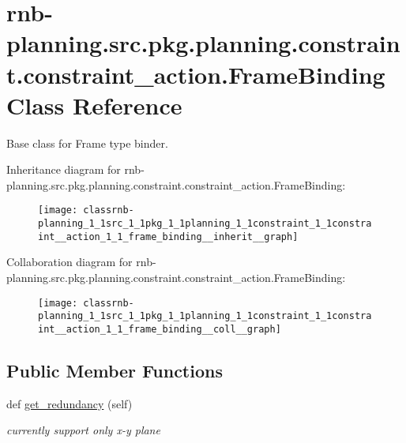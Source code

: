 \hypertarget{classrnb-planning_1_1src_1_1pkg_1_1planning_1_1constraint_1_1constraint__action_1_1_frame_binding}{}\section{rnb-\/planning.src.\+pkg.\+planning.\+constraint.\+constraint\+\_\+action.\+Frame\+Binding Class Reference}
\label{classrnb-planning_1_1src_1_1pkg_1_1planning_1_1constraint_1_1constraint__action_1_1_frame_binding}


Base class for Frame type binder.  




Inheritance diagram for rnb-\/planning.src.\+pkg.\+planning.\+constraint.\+constraint\+\_\+action.\+Frame\+Binding\+:\nopagebreak
\begin{figure}[H]
\begin{center}
\leavevmode
\texttt{[image: classrnb-planning\_1\_1src\_1\_1pkg\_1\_1planning\_1\_1constraint\_1\_1constraint\_\_action\_1\_1\_frame\_binding\_\_inherit\_\_graph]}
\end{center}
\end{figure}


Collaboration diagram for rnb-\/planning.src.\+pkg.\+planning.\+constraint.\+constraint\+\_\+action.\+Frame\+Binding\+:\nopagebreak
\begin{figure}[H]
\begin{center}
\leavevmode
\texttt{[image: classrnb-planning\_1\_1src\_1\_1pkg\_1\_1planning\_1\_1constraint\_1\_1constraint\_\_action\_1\_1\_frame\_binding\_\_coll\_\_graph]}
\end{center}
\end{figure}
\subsection*{Public Member Functions}
\begin{DoxyCompactItemize}
\item 
\mbox{\label{classrnb-planning_1_1src_1_1pkg_1_1planning_1_1constraint_1_1constraint__action_1_1_frame_binding_abf3305a0de1206ad53f941b6b65407ad}} 
def \hyperlink{classrnb-planning_1_1src_1_1pkg_1_1planning_1_1constraint_1_1constraint__action_1_1_frame_binding_abf3305a0de1206ad53f941b6b65407ad}{get\+\_\+redundancy} (self)
\begin{DoxyCompactList}\small\item\em currently support only x-\/y plane \end{DoxyCompactList}\end{DoxyCompactItemize}

